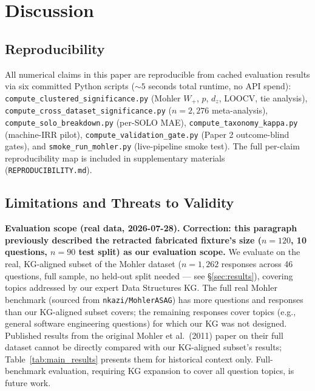 \documentclass[conference]{IEEEtran}
\begin{document}
\section{Discussion}
\label{sec:discussion}

\subsection{Reproducibility}

All numerical claims in this paper are reproducible from cached evaluation
results via six committed Python scripts ($\sim 5$ seconds total runtime,
no API spend): \texttt{compute\_clustered\_significance.py} (Mohler $W_+$,
$p$, $d_z$, LOOCV, tie analysis), \texttt{compute\_cross\_dataset\_significance.py}
($n=2{,}276$ meta-analysis), \texttt{compute\_solo\_breakdown.py}
(per-SOLO MAE), \texttt{compute\_taxonomy\_kappa.py} (machine-IRR pilot),
\texttt{compute\_validation\_gate.py} (Paper 2 outcome-blind gates), and
\texttt{smoke\_run\_mohler.py} (live-pipeline smoke test). The full
per-claim reproducibility map is included in supplementary materials
(\texttt{REPRODUCIBILITY.md}).

\subsection{Limitations and Threats to Validity}
\label{sec:limitations}

\textbf{Evaluation scope (real data, 2026-07-28).} \textbf{Correction: this
paragraph previously described the retracted fabricated fixture's size
($n=120$, 10 questions, $n=90$ test split) as our evaluation scope.} We
evaluate on the real, KG-aligned subset of the Mohler dataset
($n = 1{,}262$ responses across 46 questions, full sample, no held-out
split needed --- see \S\ref{sec:results}), covering topics addressed by
our expert Data Structures KG. The full real Mohler benchmark (sourced
from \texttt{nkazi/MohlerASAG}) has more questions and responses than
our KG-aligned subset covers; the remaining responses cover topics
(e.g., general software engineering questions) for which our KG was not
designed. Published results from the original Mohler et al.\ (2011)
paper on their full dataset cannot be directly compared with our
KG-aligned subset's results; Table~\ref{tab:main_results} presents them
for historical context only. Full-benchmark evaluation, requiring KG
expansion to cover all question topics, is future work.
\end{document}
